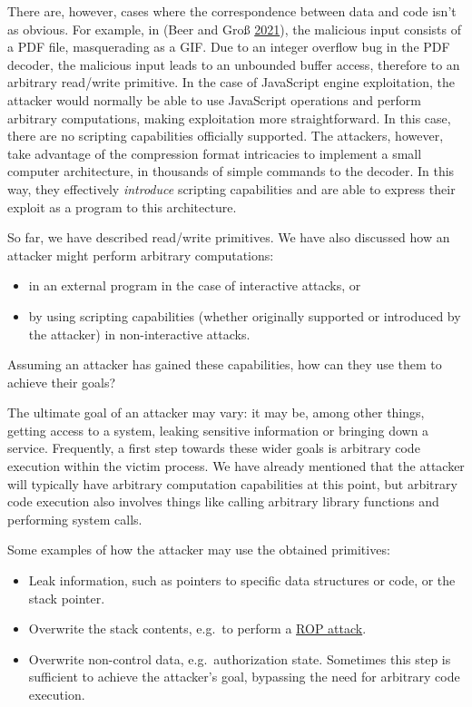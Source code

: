 \documentclass[a4paper,]{report}
\providecommand{\tightlist}{%
  \setlength{\itemsep}{0pt}\setlength{\parskip}{0pt}}
\begin{document}
There are, however, cases where the correspondence between data and code
isn't as obvious. For example, in (Beer and Groß
\protect\hyperlink{ref-Beer2021}{2021}), the malicious input consists of
a PDF file, masquerading as a GIF. Due to an integer overflow bug in the
PDF decoder, the malicious input leads to an unbounded buffer access,
therefore to an arbitrary read/write primitive. In the case of
JavaScript engine exploitation, the attacker would normally be able to
use JavaScript operations and perform arbitrary computations, making
exploitation more straightforward. In this case, there are no scripting
capabilities officially supported. The attackers, however, take
advantage of the compression format intricacies to implement a small
computer architecture, in thousands of simple commands to the decoder.
In this way, they effectively \emph{introduce} scripting capabilities
and are able to express their exploit as a program to this architecture.

So far, we have described read/write primitives. We have also discussed
how an attacker might perform arbitrary computations:

\begin{itemize}
\tightlist
\item
  in an external program in the case of interactive attacks, or
\item
  by using scripting capabilities (whether originally supported or
  introduced by the attacker) in non-interactive attacks.
\end{itemize}

Assuming an attacker has gained these capabilities, how can they use
them to achieve their goals?

The ultimate goal of an attacker may vary: it may be, among other
things, getting access to a system, leaking sensitive information or
bringing down a service. Frequently, a first step towards these wider
goals is arbitrary code execution within
the victim process. We have already mentioned that the attacker will
typically have arbitrary computation capabilities at this point, but
arbitrary code execution also involves things like calling arbitrary
library functions and performing system calls.

Some examples of how the attacker may use the obtained primitives:

\begin{itemize}
\tightlist
\item
  Leak information, such as pointers to specific data structures or
  code, or the stack pointer.
\item
  Overwrite the stack contents, e.g.~to perform a
  \protect\hyperlink{rop}{ROP attack}.
\item
  Overwrite non-control data, e.g.~authorization state. Sometimes this
  step is sufficient to achieve the attacker's goal, bypassing the need
  for arbitrary code execution.
\end{itemize}
\end{document}
